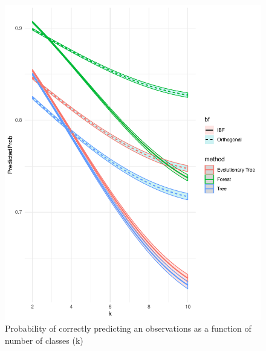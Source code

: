 \documentclass[]{elsarticle} %
\makeatletter
\def\maxwidth{\ifdim\Gin@nat@width>\linewidth\linewidth
\else\Gin@nat@width\fi}
\let\Oldincludegraphics\includegraphics
\renewcommand{\includegraphics}[1]{\Oldincludegraphics[width=\maxwidth]{#1}}
\makeatother
\begin{document}
\begin{figure}
\centering
\includegraphics{Trees_with_Base_Functions_v2_files/figure-latex/fig14-estimated-accuracy-k-1.pdf}
\caption{\label{fig:fig14-estimated-accuracy-k}Probability of correctly
predicting an observations as a function of number of classes (k)}
\end{figure}
\end{document}
